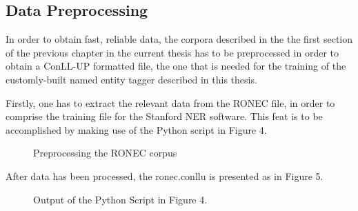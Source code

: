 \documentclass[12pt,a4paper]{article}
\begin{document}
\subsection{Data Preprocessing}

\qquad \quad In order to obtain fast, reliable data, the corpora described in the the first section of the previous chapter in the current thesis has to be preprocessed in order to obtain a ConLL-UP formatted file, the one that is needed for the training of the customly-built named entity tagger described in this thesis.

\qquad Firstly, one has to extract the relevant data from the RONEC file, in order to comprise the training file for the Stanford NER software. This feat is to be accomplished by making use of the Python script in Figure 4.
\begin{figure}[h!]
\begin{center}
\end{center}
\caption{Preprocessing the RONEC corpus}
\end{figure}
After data has been processed, the ronec.conllu is presented as in Figure 5.
\begin{figure}[h!]
\begin{center}
\end{center}
\caption{Output of the Python Script in Figure 4.}
\end{figure}
\end{document}
